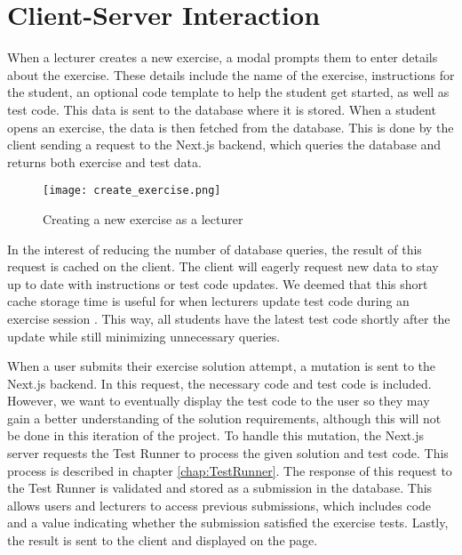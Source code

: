 \section{Client-Server Interaction}
When a lecturer creates a new exercise, a modal prompts them to enter details about the exercise.
These details include the name of the exercise, instructions for the student, an optional code template to help the student get started, as well as test code.
This data is sent to the database where it is stored.
When a student opens an exercise, the data is then fetched from the database.
This is done by the client sending a request to the Next.js backend, which queries the database and returns both exercise and test data.

\begin{figure}[H]
    \centering
    \texttt{[image: create\_exercise.png]}
    \caption{Creating a new exercise as a lecturer}
    \label{fig:create_exercise}
\end{figure}

In the interest of reducing the number of database queries, the result of this request is cached on the client.
The client will eagerly request new data to stay up to date with instructions or test code updates. 
We deemed that this short cache storage time is useful for when lecturers update test code during an exercise session .
This way, all students have the latest test code shortly after the update while still minimizing unnecessary queries. 

When a user submits their exercise solution attempt, a mutation is sent to the Next.js backend. 
In this request, the necessary code and test code is included. 
However, we want to eventually display the test code to the user so they may gain a better understanding of the solution requirements, although this will not be done in this iteration of the project.
To handle this mutation, the Next.js server requests the Test Runner to process the given solution and test code.
This process is described in chapter \ref{chap:TestRunner}.
The response of this request to the Test Runner is validated and stored as a submission in the database.
This allows users and lecturers to access previous submissions, which includes code and a value indicating whether the submission satisfied the exercise tests.
Lastly, the result is sent to the client and displayed on the page.

